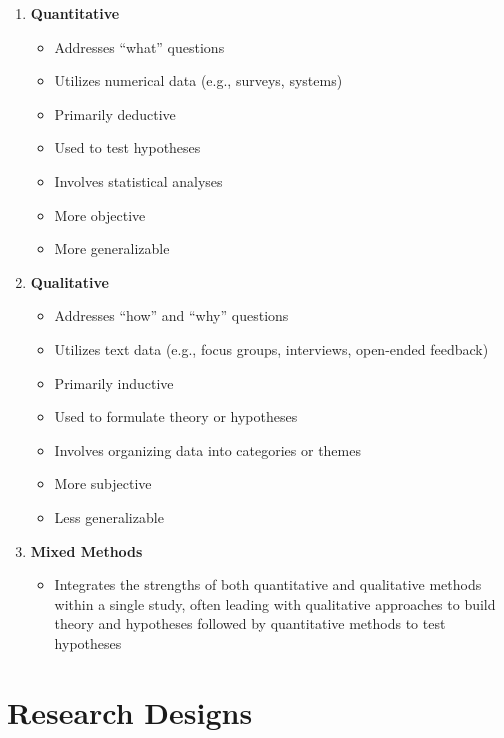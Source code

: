 \documentclass[]{book}
\providecommand{\tightlist}{%
  \setlength{\itemsep}{0pt}\setlength{\parskip}{0pt}}
\begin{document}
\begin{enumerate}
\def\labelenumi{\arabic{enumi}.}
\tightlist
\item
  \textbf{Quantitative}

  \begin{itemize}
  \tightlist
  \item
    Addresses ``what'' questions
  \item
    Utilizes numerical data (e.g., surveys, systems)
  \item
    Primarily deductive
  \item
    Used to test hypotheses
  \item
    Involves statistical analyses
  \item
    More objective
  \item
    More generalizable
  \end{itemize}
\item
  \textbf{Qualitative}

  \begin{itemize}
  \tightlist
  \item
    Addresses ``how'' and ``why'' questions
  \item
    Utilizes text data (e.g., focus groups, interviews, open-ended feedback)
  \item
    Primarily inductive
  \item
    Used to formulate theory or hypotheses
  \item
    Involves organizing data into categories or themes
  \item
    More subjective
  \item
    Less generalizable
  \end{itemize}
\item
  \textbf{Mixed Methods}

  \begin{itemize}
  \tightlist
  \item
    Integrates the strengths of both quantitative and qualitative methods within a single study, often leading with qualitative approaches to build theory and hypotheses followed by quantitative methods to test hypotheses
  \end{itemize}
\end{enumerate}

\hypertarget{research-designs}{%
\section{Research Designs}\label{research-designs}}
\end{document}
